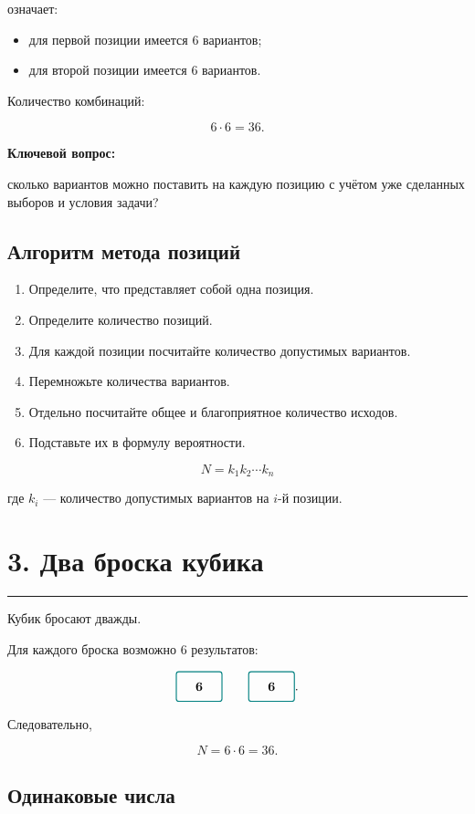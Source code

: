 \documentclass[a4paper,12pt]{article}
\newcommand{\sectionline}{%
    \vspace{0.2em}
    {\color{accent}\rule{\linewidth}{0.7pt}}
    \vspace{0.4em}
}
\newcommand{\positionbox}[1]{%
    \tikz[baseline=-0.7ex]\node[
        draw=accent,
        rounded corners=2pt,
        minimum width=1.25cm,
        minimum height=0.8cm,
        line width=0.8pt
    ]{\textbf{#1}};%
}
\newcommand{\important}[1]{%
    \par\smallskip
    {\color{darkaccent}\textbf{#1}}
    \par\smallskip
}
\begin{document}
означает:

\begin{itemize}[leftmargin=1.5em]
    \item для первой позиции имеется \(6\) вариантов;
    \item для второй позиции имеется \(6\) вариантов.
\end{itemize}

Количество комбинаций:

\[
6\cdot6=36.
\]

\important{Ключевой вопрос:}
сколько вариантов можно поставить на каждую позицию с учётом уже сделанных выборов и условия задачи?

\subsection*{Алгоритм метода позиций}

\begin{enumerate}[leftmargin=1.7em]
    \item Определите, что представляет собой одна позиция.
    \item Определите количество позиций.
    \item Для каждой позиции посчитайте количество допустимых вариантов.
    \item Перемножьте количества вариантов.
    \item Отдельно посчитайте общее и благоприятное количество исходов.
    \item Подставьте их в формулу вероятности.
\end{enumerate}

\[
\boxed{
N=k_1k_2\cdots k_n
}
\]

где \(k_i\) --- количество допустимых вариантов на \(i\)-й позиции.

\section*{3. Два броска кубика}
\sectionline

Кубик бросают дважды.

Для каждого броска возможно \(6\) результатов:

\[
\positionbox{6}
\qquad
\positionbox{6}.
\]

Следовательно,

\[
N=6\cdot6=36.
\]

\subsection*{Одинаковые числа}
\end{document}
